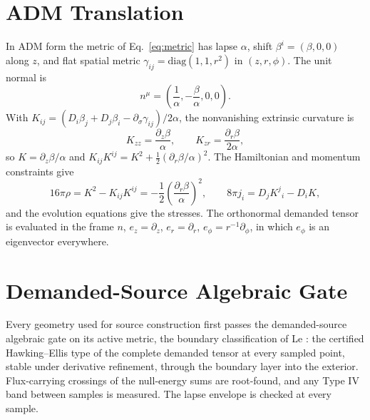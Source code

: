\documentclass[11pt]{article}
\newcommand{\sig}{\sigma}
\begin{document}
\section{ADM Translation}

In ADM form the metric of Eq.~\eqref{eq:metric} has lapse $\alpha$, shift $\beta^i=(\beta,0,0)$ along $z$, and flat spatial metric $\gamma_{ij}=\mathrm{diag}(1,1,r^2)$ in $(z,r,\phi)$. The unit normal is
\begin{equation}
n^\mu=\left(\frac{1}{\alpha},-\frac{\beta}{\alpha},0,0\right).
\end{equation}
With $K_{ij}=(D_i\beta_j+D_j\beta_i-\partial_\sig\gamma_{ij})/2\alpha$, the nonvanishing extrinsic curvature is
\begin{equation}
K_{zz}=\frac{\partial_z\beta}{\alpha},\qquad K_{zr}=\frac{\partial_r\beta}{2\alpha},
\end{equation}
so $K=\partial_z\beta/\alpha$ and $K_{ij}K^{ij}=K^2+\tfrac12(\partial_r\beta/\alpha)^2$. The Hamiltonian and momentum constraints give
\begin{equation}
16\pi\rho=K^2-K_{ij}K^{ij}=-\frac12\left(\frac{\partial_r\beta}{\alpha}\right)^2,
\qquad
8\pi j_i=D_jK^j{}_i-D_iK ,
\end{equation}
and the evolution equations give the stresses. The orthonormal demanded tensor is evaluated in the frame $n$, $e_z=\partial_z$, $e_r=\partial_r$, $e_\phi=r^{-1}\partial_\phi$, in which $e_\phi$ is an eigenvector everywhere.

\section{Demanded-Source Algebraic Gate}

Every geometry used for source construction first passes the demanded-source algebraic gate on its active metric, the boundary classification of Le \cite{Le2026}: the certified Hawking--Ellis type of the complete demanded tensor at every sampled point, stable under derivative refinement, through the boundary layer into the exterior. Flux-carrying crossings of the null-energy sums are root-found, and any Type IV band between samples is measured. The lapse envelope is checked at every sample.
\end{document}
